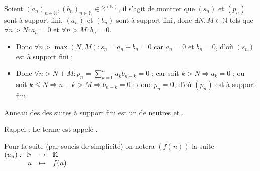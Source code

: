 \documentclass[12pt,a4paper]{report}
\begin{document}
    
    \begin{demo}
    Soient $(a_n)_{n \in \mathbb{N}}, (b_n)_{n \in \mathbb{N}} \in \mathbb{K}^{(\mathbb{N})}$, il s'agit de montrer que $(s_n)$ et $(p_n)$ sont à support fini. $(a_n)$ et $(b_n)$ sont à support fini, donc $\exists N, M \in \mathbb{N}$ tels que $\forall n > N : a_n = 0$ et $\forall n > M : b_n = 0$.
    \begin{itemize}
        \item Donc $\forall n > \max(N, M) : s_n = a_n + b_n = 0$ car $a_n = 0$ et $b_n = 0$, d'où $(s_n)$ est à support fini ;
        \item Donc $\displaystyle \forall n > N + M : p_n = \sum_{k = 0}^n a_k b_{n-k} = 0$ ; car soit $k > N \Rightarrow a_k = 0$ ; ou soit $k \leqslant N \Rightarrow n-k > M \Rightarrow b_{n-k} = 0$ ; donc $p_n = 0$, d'où $(p_n)$ est à support fini.
    \end{itemize}
    \end{demo}

    
    \begin{proposition}{Anneau des des suites à support fini}{}
     est un  de neutres  et .
    \end{proposition}
    
    \begin{remarque}
    Rappel : Le terme  est appelé .
    \end{remarque}
    
    \begin{remarque}
    Pour la suite (par soucis de simplicité) on notera $(f(n))$ la suite $(u_n) : \begin{array}[t]{rcl} \mathbb{N} & \rightarrow & \mathbb{K} \\ n & \mapsto & f(n) \end{array}$
    \end{remarque}
    
\end{document}
